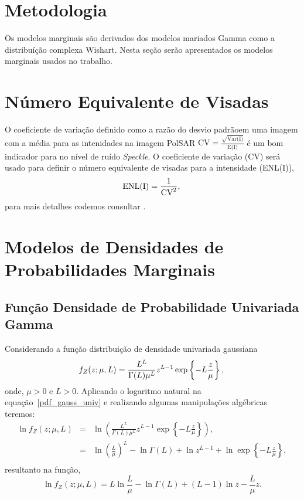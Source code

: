 \section{Metodologia}

Os modelos marginais são derivados dos modelos mariados Gamma como a distribuíção complexa Wishart.
 Nesta seção serão apresentados os modelos marginais usados no trabalho.

\section{Número Equivalente de Visadas}
O coeficiente de variação definido como a razão do desvio padrãoem uma imagem com a média para as intenidades na imagem PolSAR $\text{CV}=\frac{\sqrt{\text{Var(I)}}}{\text{E(I)}}$ é um bom indicador para no nível de ruído \textit{Speckle}. O coeficiente de variação (CV) será usado para definir o número equivalente de visadas para a intensidade (ENL(I)), 
\begin{equation}\label{eq:ENL}
	\text{ENL(I)} = \frac{1}{\text{CV}^2}, \\
\end{equation}
para mais detalhes codemos consultar \citet{ljdwo}.
\section{Modelos de Densidades de Probabilidades Marginais}
\subsection{Função Densidade de Probabilidade Univariada Gamma}
Considerando a função distribuição de densidade univariada gaussiana 
\begin{equation}\label{pdf_gauss_univ}
	f_{Z}(z;\mu,L)=\frac{L^{L}}{\Gamma(L)\mu^{L}} z^{L-1}\exp\left\{-L\frac{z}{\mu}\right\}, \\
\end{equation}
onde, $\mu>0$ e $L>0$. Aplicando o logaritmo natural na equação~\eqref{pdf_gauss_univ}  e realizando algumas manipulações algébricas teremos:
\begin{equation}\nonumber
\begin{array}{ccl}
	\ln f_{Z}(z;\mu,L)&=&\ln \left(\frac{L^{L}}{\Gamma(L)\mu^{L}} z^{L-1}\exp\left\{-L\frac{z}{\mu}\right\}\right), \\
	                                         &=&\ln\left(\frac{L}{\mu}\right)^L-\ln\Gamma(L)+ \ln z^{L-1} + \ln \exp\left\{-L\frac{z}{\mu}\right\}, \\
\end{array}
\end{equation}
resultanto na função,
\begin{equation}\label{func_log_univ_gaussiana}
	\ln f_{Z}(z;\mu,L)=L\ln\frac{L}{\mu}-\ln\Gamma(L)+(L-1)\ln z - \frac{L}{\mu} z.
\end{equation}

